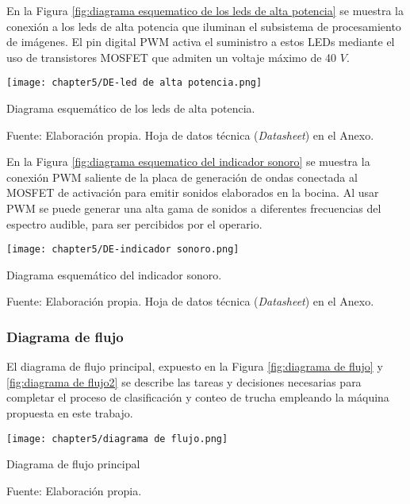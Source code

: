 En la Figura \ref{fig:diagrama esquematico de los leds de alta potencia} se muestra la conexión a los leds de alta potencia que iluminan el subsistema de procesamiento de imágenes. El pin digital PWM activa el suministro a estos LEDs mediante el uso de transistores MOSFET que admiten un voltaje máximo de 40 $V$.

\begin{myfigure}[H]
	\footnotesize\centering
	\texttt{[image: chapter5/DE-led de alta potencia.png]}
	\caption{Diagrama esquemático de los leds de alta potencia.}
	\begin{myflushcenter}
		Fuente: Elaboración propia. Hoja de datos técnica (\textit{Datasheet}) en el Anexo.
	\end{myflushcenter}
	\label{fig:diagrama esquematico de los leds de alta potencia}
\end{myfigure}

En la Figura \ref{fig:diagrama esquematico del indicador sonoro} se muestra la conexión PWM saliente de la placa de generación de ondas conectada al MOSFET de activación para emitir sonidos elaborados en la bocina. Al usar PWM se puede generar una alta gama de sonidos a diferentes frecuencias del espectro audible, para ser percibidos por el operario.

\begin{myfigure}[H]
	\footnotesize\centering
	\texttt{[image: chapter5/DE-indicador sonoro.png]}
	\caption{Diagrama esquemático del indicador sonoro.}
	\begin{myflushcenter}
		Fuente: Elaboración propia. Hoja de datos técnica (\textit{Datasheet}) en el Anexo.
	\end{myflushcenter}
	\label{fig:diagrama esquematico del indicador sonoro}
\end{myfigure}




\subsubsection{Diagrama de flujo}

El diagrama de flujo principal, expuesto en la Figura \ref{fig:diagrama de flujo} y \ref{fig:diagrama de flujo2} se describe las tareas y decisiones necesarias para completar el proceso de clasificación y conteo de trucha empleando la máquina propuesta en este trabajo.

\begin{myfigure}[H]
	\footnotesize\centering
	\texttt{[image: chapter5/diagrama de flujo.png]}
	\caption{Diagrama de flujo principal}
	\begin{myflushcenter}
		Fuente: Elaboración propia.
	\end{myflushcenter}
	\label{fig:diagrama de flujo}
\end{myfigure}

